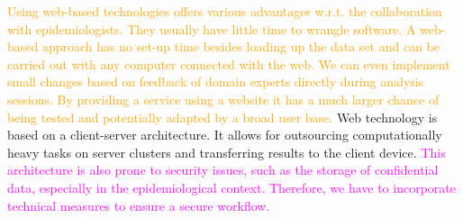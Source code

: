 \documentclass[journal]{style/vgtc} 			          %
\newcommand{\design}[1]{\textcolor{orange}{#1}}
\newcommand{\magenta}[1]{\textcolor{magenta}{#1}}
\begin{document}
\design{
Using web-based technologies offers various advantages w.r.t. the collaboration with epidemiologists.
They usually have little time to wrangle software.
A web-based approach has no set-up time besides loading up the data set and can be carried out with any computer connected with the web.
We can even implement small changes based on feedback of domain experts directly during analysis sessions. %
By providing a service using a website it has a much larger chance of being tested and potentially adapted by a broad user base.
}
Web technology is based on a client-server architecture.
It allows for outsourcing computationally heavy tasks on server clusters and transferring results to the client device.
\magenta{
This architecture is also prone to security issues, such as the storage of confidential data, especially in the epidemiological context.
Therefore, we have to incorporate technical measures to ensure a secure workflow.
}
\end{document}

